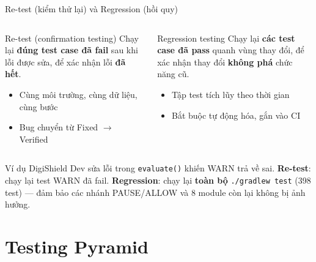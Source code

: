 \documentclass[aspectratio=169,12pt]{beamer}
\begin{document}
\begin{frame}{Re-test (kiểm thử lại) và Regression (hồi quy)}
  \begin{columns}[T]
    \begin{block}{Re-test (confirmation testing) \cite{istqb}}
      Chạy lại \textbf{đúng test case đã fail} sau khi lỗi được sửa, để xác nhận
      lỗi \textbf{đã hết}.
      \begin{itemize}
        \item \small Cùng môi trường, cùng dữ liệu, cùng bước
        \item \small Bug chuyển từ Fixed $\to$ Verified
      \end{itemize}
    \end{block}
    \begin{block}{Regression testing}
      Chạy lại \textbf{các test case đã pass} quanh vùng thay đổi, để xác nhận thay đổi
      \textbf{không phá} chức năng cũ.
      \begin{itemize}
        \item \small Tập test tích lũy theo thời gian
        \item \small Bắt buộc tự động hóa, gắn vào CI
      \end{itemize}
    \end{block}
  \end{columns}

  \vspace{0.3em}
  \begin{exampleblock}{Ví dụ DigiShield}
    \small Dev sửa lỗi trong \texttt{evaluate()} khiến WARN trả về sai.
    \textbf{Re-test}: chạy lại test WARN đã fail. \textbf{Regression}: chạy lại
    \textbf{toàn bộ} \texttt{./gradlew test} (398 test) --- đảm bảo các nhánh
    PAUSE/ALLOW và 8 module còn lại không bị ảnh hưởng.
  \end{exampleblock}
\end{frame}

\section{Testing Pyramid}
\end{document}
